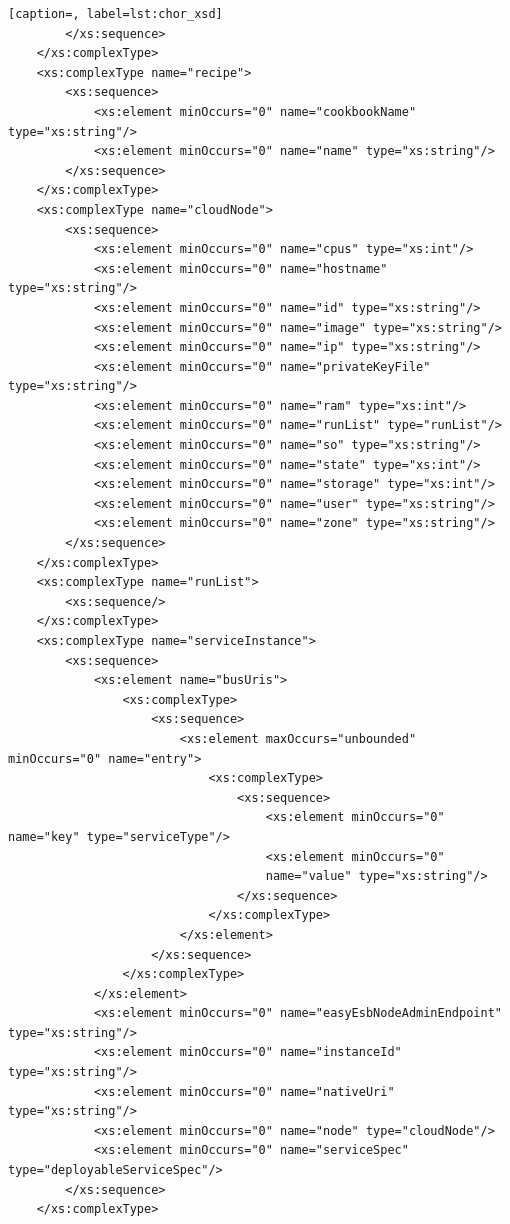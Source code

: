 \documentclass[a4paper, 10pt]{article}
\begin{document}
{\begin{lstlisting}[caption=, label=lst:chor_xsd]
        </xs:sequence>
    </xs:complexType>
    <xs:complexType name="recipe">
        <xs:sequence>
            <xs:element minOccurs="0" name="cookbookName" type="xs:string"/>
            <xs:element minOccurs="0" name="name" type="xs:string"/>
        </xs:sequence>
    </xs:complexType>
    <xs:complexType name="cloudNode">
        <xs:sequence>
            <xs:element minOccurs="0" name="cpus" type="xs:int"/>
            <xs:element minOccurs="0" name="hostname" type="xs:string"/>
            <xs:element minOccurs="0" name="id" type="xs:string"/>
            <xs:element minOccurs="0" name="image" type="xs:string"/>
            <xs:element minOccurs="0" name="ip" type="xs:string"/>
            <xs:element minOccurs="0" name="privateKeyFile" type="xs:string"/>
            <xs:element minOccurs="0" name="ram" type="xs:int"/>
            <xs:element minOccurs="0" name="runList" type="runList"/>
            <xs:element minOccurs="0" name="so" type="xs:string"/>
            <xs:element minOccurs="0" name="state" type="xs:int"/>
            <xs:element minOccurs="0" name="storage" type="xs:int"/>
            <xs:element minOccurs="0" name="user" type="xs:string"/>
            <xs:element minOccurs="0" name="zone" type="xs:string"/>
        </xs:sequence>
    </xs:complexType>
    <xs:complexType name="runList">
        <xs:sequence/>
    </xs:complexType>
    <xs:complexType name="serviceInstance">
        <xs:sequence>
            <xs:element name="busUris">
                <xs:complexType>
                    <xs:sequence>
                        <xs:element maxOccurs="unbounded" minOccurs="0" name="entry">
                            <xs:complexType>
                                <xs:sequence>
                                    <xs:element minOccurs="0" name="key" type="serviceType"/>
                                    <xs:element minOccurs="0"
                                    name="value" type="xs:string"/>
                                </xs:sequence>
                            </xs:complexType>
                        </xs:element>
                    </xs:sequence>
                </xs:complexType>
            </xs:element>
            <xs:element minOccurs="0" name="easyEsbNodeAdminEndpoint" type="xs:string"/>
            <xs:element minOccurs="0" name="instanceId" type="xs:string"/>
            <xs:element minOccurs="0" name="nativeUri" type="xs:string"/>
            <xs:element minOccurs="0" name="node" type="cloudNode"/>
            <xs:element minOccurs="0" name="serviceSpec" type="deployableServiceSpec"/>
        </xs:sequence>
    </xs:complexType>

\end{lstlisting}}
\end{document}
